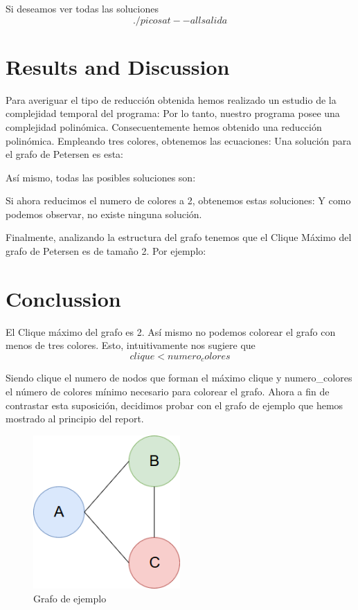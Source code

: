 \documentclass{article}
\begin{document}
        Si deseamos ver todas las soluciones 
        \[./picosat --all salida\]


\section{Results and Discussion}
    Para averiguar el tipo de reducción obtenida hemos realizado un estudio de la complejidad temporal del programa: 
    Por lo tanto, nuestro programa posee una complejidad polinómica. Consecuentemente hemos obtenido una reducción polinómica.
    Empleando tres colores, obtenemos las ecuaciones: 
    Una solución para el grafo de Petersen es esta: 

    Así mismo, todas las posibles soluciones son: 
    
    Si ahora reducimos el numero de colores a 2, obtenemos estas soluciones:
    Y como podemos observar, no existe ninguna solución.

    Finalmente, analizando la estructura del grafo tenemos que el Clique Máximo del grafo de Petersen es de tamaño 2. Por ejemplo: 

\section{Conclussion}
El Clique máximo del grafo es 2. Así mismo no podemos colorear el grafo con menos de tres colores. Esto, intuitivamente nos sugiere que 
    \[clique < numero_colores\]

Siendo clique el numero de nodos que forman el máximo clique y numero\_colores el número 
de colores mínimo necesario para colorear el grafo. Ahora a 
fin de contrastar esta suposición, decidimos probar con el grafo de ejemplo que hemos mostrado al principio del report. 
\begin{figure}[H]
    \centering
    \includegraphics[width=0.5\textwidth]{pictures/ejemplo.png}
    \caption{Grafo de ejemplo}
\end{figure}
\end{document}
